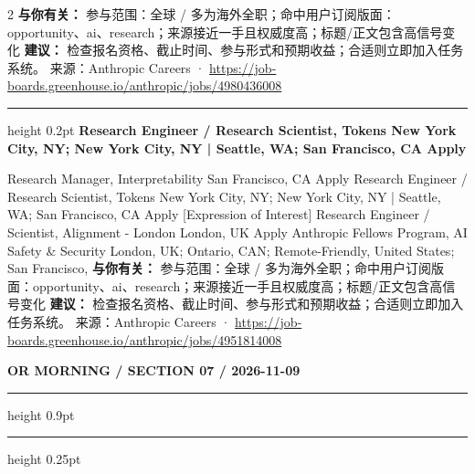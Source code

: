 \documentclass[10.5pt]{ctexart}
\begin{document}
\begin{multicols}{2}
\textbf{与你有关：} 参与范围：全球 / 多为海外全职；命中用户订阅版面：opportunity、ai、research；来源接近一手且权威度高；标题/正文包含高信号变化
\textbf{建议：} 检查报名资格、截止时间、参与形式和预期收益；合适则立即加入任务系统。
{\footnotesize\color{ormuted} 来源：Anthropic Careers · \url{https://job-boards.greenhouse.io/anthropic/jobs/4980436008}}
\vspace{2mm}
\hrule height 0.2pt
\vspace{2mm}
{\large\bfseries Research Engineer / Research Scientist, Tokens New York City, NY; New York City, NY | Seattle, WA; San Francisco, CA Apply}\par
[Expression of Interest] Research Manager, Interpretability San Francisco, CA Apply Research Engineer / Research Scientist, Tokens New York City, NY; New York City, NY | Seattle, WA; San Francisco, CA Apply [Expression of Interest] Research Engineer / Scientist, Alignment - London London, UK Apply Anthropic Fellows Program, AI Safety \& Security London, UK; Ontario, CAN; Remote-Friendly, United States; San Francisco, 
\textbf{与你有关：} 参与范围：全球 / 多为海外全职；命中用户订阅版面：opportunity、ai、research；来源接近一手且权威度高；标题/正文包含高信号变化
\textbf{建议：} 检查报名资格、截止时间、参与形式和预期收益；合适则立即加入任务系统。
{\footnotesize\color{ormuted} 来源：Anthropic Careers · \url{https://job-boards.greenhouse.io/anthropic/jobs/4951814008}}
\end{multicols}
\newpage
{\small\bfseries OR MORNING / SECTION 07 / 2026-11-09}
\vspace{2mm}
\hrule height 0.9pt
\vspace{1.5mm}
\hrule height 0.25pt
\vspace{4mm}
\end{document}
